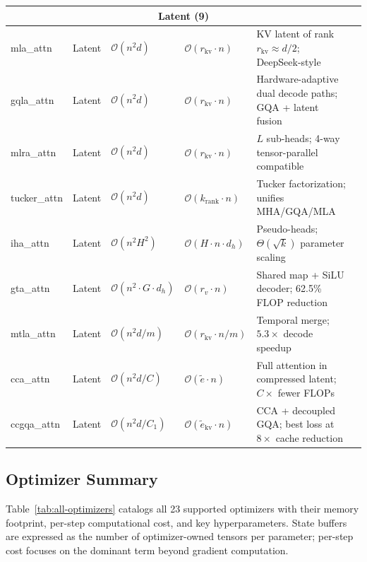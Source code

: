 \begin{longtable}{p{2.0cm}p{1.3cm}p{2.2cm}p{2.2cm}p{4.0cm}p{2.5cm}}
\multicolumn{6}{c}{\textbf{Latent (9)}} \\
\midrule
mla\_attn & Latent & $\mathcal{O}(n^2 d)$ & $\mathcal{O}(r_{\text{kv}} \cdot n)$ & KV latent of rank $r_{\text{kv}} \approx d/2$; DeepSeek-style & \citep{mehta_mla_2025} \\
gqla\_attn & Latent & $\mathcal{O}(n^2 d)$ & $\mathcal{O}(r_{\text{kv}} \cdot n)$ & Hardware-adaptive dual decode paths; GQA + latent fusion & \citep{meng_gqla_2026} \\
mlra\_attn & Latent & $\mathcal{O}(n^2 d)$ & $\mathcal{O}(r_{\text{kv}} \cdot n)$ & $L$ sub-heads; 4-way tensor-parallel compatible & \citep{liu_mlra_2026} \\
tucker\_attn & Latent & $\mathcal{O}(n^2 d)$ & $\mathcal{O}(k_{\text{rank}} \cdot n)$ & Tucker factorization; unifies MHA/GQA/MLA & \citep{klein_tucker_2026} \\
iha\_attn & Latent & $\mathcal{O}(n^2 H^2)$ & $\mathcal{O}(H \cdot n \cdot d_h)$ & Pseudo-heads; $\Theta(\sqrt{k})$ parameter scaling & \citep{duvvuri_iha_2026} \\
gta\_attn & Latent & $\mathcal{O}(n^2 \cdot G \cdot d_h)$ & $\mathcal{O}(r_v \cdot n)$ & Shared map + SiLU decoder; 62.5\% FLOP reduction & \citep{sun_gta_2025} \\
mtla\_attn & Latent & $\mathcal{O}(n^2 d / m)$ & $\mathcal{O}(r_{\text{kv}} \cdot n / m)$ & Temporal merge; $5.3\times$ decode speedup & \citep{deng_mtla_2025} \\
cca\_attn & Latent & $\mathcal{O}(n^2 d / C)$ & $\mathcal{O}(\tilde{e} \cdot n)$ & Full attention in compressed latent; $C\times$ fewer FLOPs & \citep{figliola_cca_2025} \\
ccgqa\_attn & Latent & $\mathcal{O}(n^2 d / C_1)$ & $\mathcal{O}(\tilde{e}_{\text{kv}} \cdot n)$ & CCA + decoupled GQA; best loss at $8\times$ cache reduction & \citep{figliola_cca_2025} \\
\bottomrule
\end{longtable}
\normalsize

\subsection{Optimizer Summary}

Table~\ref{tab:all-optimizers} catalogs all 23 supported optimizers with their memory footprint, per-step computational cost, and key hyperparameters. State buffers are expressed as the number of optimizer-owned tensors per parameter; per-step cost focuses on the dominant term beyond gradient computation.

